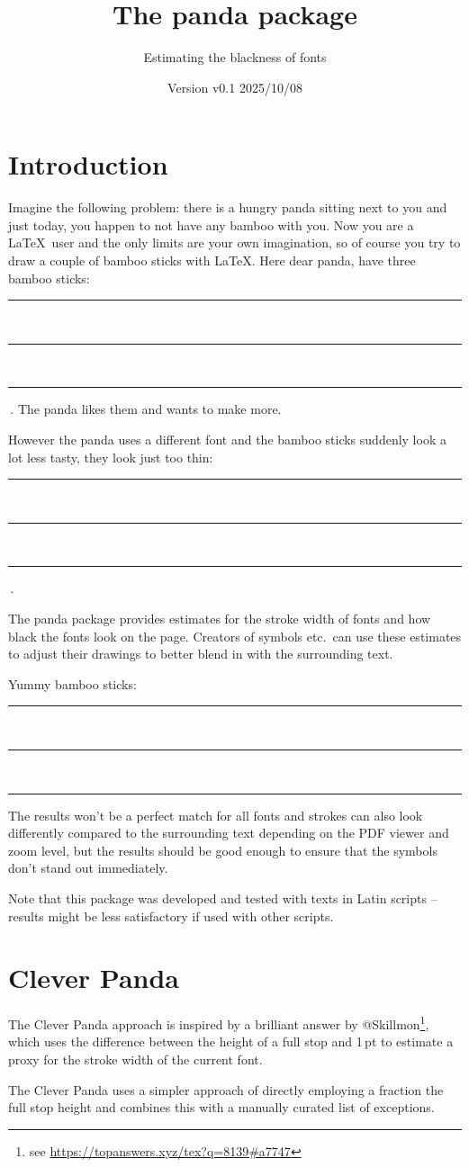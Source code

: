 \documentclass{scrartcl}
\title{The panda package}
\subtitle{Estimating the blackness of fonts}
\author{%
  \texorpdfstring{
   \begin{tikzpicture}
     \colorlet{black}{samdgray}
     \panda
   \end{tikzpicture}\\[0.8em]
   \texttt{samcarter}\\
   \url{https://github.com/samcarter/panda}\\
  }{samcarter}}
\date{Version v0.1 \textendash{} 2025/10/08}
\newcommand{\badbamboo}[2]{%
  \rule{#1}{#2}\,\rule{#1}{#2}\,\rule{#1}{#2}%
}
\newcommand{\busybamboo}{%
  \rule{ \BusyPanda{0.125}\fontcharht\font`I }{ \fontcharht\font`I }%
}
\begin{document}
\maketitle

\section{Introduction}
\label{intro}

Imagine the following problem:
there is a hungry panda sitting next to you and just today, you happen to not have any bamboo with you.
Now you are a \LaTeX\ user and the only limits are your own imagination, so of course you try to draw a couple of bamboo sticks with \LaTeX.
Here dear panda, have three bamboo sticks: \badbamboo{0.8pt}{\fontcharht\font`I}\,.
The panda likes them and wants to make more.
{\selectfont However the panda uses a different font and the bamboo sticks suddenly look a lot less tasty, they look just too thin: \badbamboo{0.8pt}{\fontcharht\font`I}\,.}

The panda package provides estimates for the stroke width of fonts and how black the fonts look on the page.
Creators of symbols etc.\ can use these estimates to adjust their drawings to better blend in with the surrounding text.

{\selectfont Yummy bamboo sticks: \busybamboo\,\busybamboo\,\busybamboo}

The results won't be a perfect match for all fonts and strokes can also look differently compared to the surrounding text depending on the PDF viewer and zoom level, but the results should be good enough to ensure that the symbols don't stand out immediately.

Note that this package was developed and tested with texts in Latin scripts -- results might be less satisfactory if used with other scripts.

\blurb*

\section{Clever Panda}

The Clever Panda approach is inspired by a brilliant answer by @Skillmon\footnote{see \url{https://topanswers.xyz/tex?q=8139\#a7747}}, which uses the difference between the height of a full stop and 1\,pt to estimate a proxy for the stroke width of the current font.

The Clever Panda uses a simpler approach of directly employing a fraction the full stop height and combines this with a manually curated list of exceptions.
\end{document}
